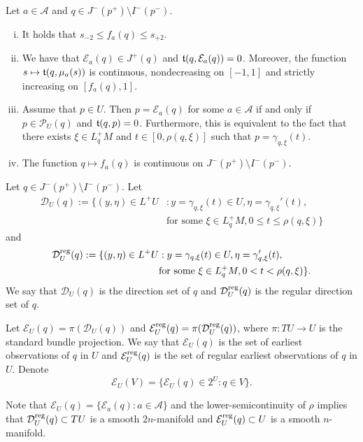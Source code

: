 \begin{lem}
    Let $a\in\mathcal{A}$ and $q\in J^-(p^+)\setminus I^-(p^-)$.
    \begin{enumerate}[i.]
    	\item It holds that $s_{-2}\leq f_a(q)\leq s_{+2}$.
    	\item We have that $\mathcal{E}_a(q)\in J^+(q)$ and $\frak{t}(q,\mathcal{E}_a(q))=0$.  Moreover, the function $s\mapsto\frak{t}(q,\mu_a(s))$ is continuous, nondecreasing on $[-1,1]$ and strictly increasing on $[f_a(q),1]$.
    	\item Assume that $p\in U$.  Then $p=\mathcal{E}_a(q)$ for some $a\in\mathcal{A}$ if and only if $p\in\mathcal{P}_U(q)$ and $\frak{t}(q,p)=0$.  Furthermore, this is equivalent to the fact that there exists $\xi\in L_q^+M$ and $t\in[0,\rho(q,\xi)]$ such that $p=\gamma_{q,\xi}(t)$.
    	\item The function $q\mapsto f_a(q)$ is continuous on $J^-(p^+)\setminus I^-(p^-)$.
    \end{enumerate}
\end{lem}

\begin{defn}
    Let $q\in J^-(p^+)\setminus I^-(p^-)$.  Let
    \begin{align*}
    	\mathcal{D}_U(q):=\{(y,\eta)\in L^+U&:y=\gamma_{q,\xi}(t)\in U, \eta=\gamma_{q,\xi}'(t),\\
    	&\text{for some }\xi\in L_q^+M, 0\leq t\leq\rho(q,\xi)\}
    \end{align*}
    and
    \begin{align*}
    	\mathcal{D}_U^{\text{reg}}(q):=\{(y,\eta)\in L^+U&:y=\gamma_{q,\xi}(t)\in U, \eta=\gamma_{q,\xi}'(t),\\
    	&\text{for some }\xi\in L_q^+M, 0<t<\rho(q,\xi)\}.
    \end{align*}
    We say that $\mathcal{D}_U(q)$ is the direction set of $q$ and $\mathcal{D}_U^{\text{reg}}(q)$ is the regular direction set of $q$.
    
    Let $\mathcal{E}_U(q)=\pi(\mathcal{D}_U(q))$ and $\mathcal{E}_U^{\text{reg}}(q)=\pi(\mathcal{D}_U^{\text{reg}}(q))$, where $\pi:TU\to U$ is the standard bundle projection.  We say that $\mathcal{E}_U(q)$ is the set of earliest observations of $q$ in $U$ and $\mathcal{E}_U^{\text{reg}}(q)$ is the set of regular earliest observations of $q$ in $U$. Denote 
    $$\mathcal{E}_U(V)=\{\mathcal{E}_U(q)\in 2^U:q\in V\}.$$
\end{defn}

Note that $\mathcal{E}_U(q)=\{\mathcal{E}_a(q):a\in\mathcal{A}\}$ and the lower-semicontinuity of $\rho$ implies that $\mathcal{D}_U^{\text{reg}}(q)\subset TU$ is a smooth $2n$-manifold and $\mathcal{E}_U^{\text{reg}}(q)\subset U$ is a smooth $n$-manifold.

